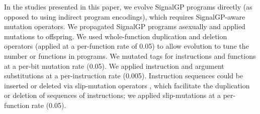 In the studies presented in this paper, we evolve SignalGP programs directly (as opposed to using indirect program encodings), which requires SignalGP-aware mutation operators. 
We propagated SignalGP programs asexually and applied mutations to offspring. 
We used whole-function duplication and deletion operators (applied at a per-function rate of 0.05) to allow evolution to tune the number or functions in programs. 
We mutated tags for instructions and functions at a per-bit mutation rate (0.05). 
We applied instruction and argument substitutions at a per-instruction rate (0.005). 
Instruction sequences could be inserted or deleted via slip-mutation operators \citep{lalejini_gene_2017}, which facilitate the duplication or deletion of sequences of instructions; we applied slip-mutations at a per-function rate (0.05). 